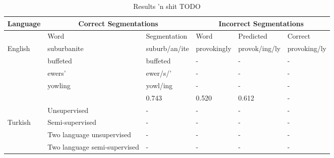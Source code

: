 \documentclass[11pt,twocolumn]{article}
\begin{document}
\begin{table*}
    \begin{center}
        \begin{tabular}{ | l | l | l | l | l | l |}
            \hline
            Language & \multicolumn{2}{|c|}{\textbf{Correct Segmentations}} & \multicolumn{3}{|c|}{\textbf{Incorrect Segmentations}}\\ \hline
                     & Word & Segmentation & Word & Predicted & Correct\\ \hline
            English & suburbanite & suburb/an/ite & provokingly & provok/ing/ly & provoking/ly  \\ 
                    & buffeted & buffeted & -  & - & -\\ 
                    & ewers' &  ewer/s/' & - & - & -\\ 
                    & yowling & yowl/ing & - & -& - \\ 
                    & \citeauthor{Narasimhan15} & 0.743 & 0.520 & 0.612 & -\\ 
                    & Unsupervised & - & - & - & -\\ 
            Turkish & Semi-supervised & - & - & -  & -\\ 
                    & Two language unsupervised  & - & - & -  & -\\ 
                    & Two language semi-supervised  & - & - & -  & -\\ \hline
        \end{tabular}
        \caption{Results 'n shit TODO}
    \end{center}
\end{table*}



\end{document}
